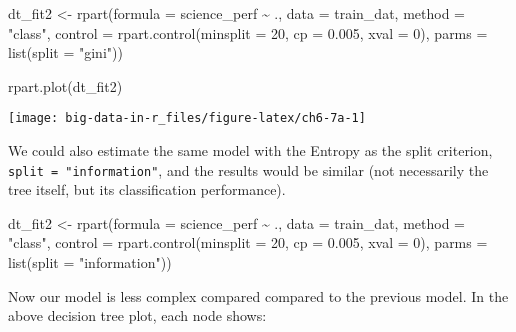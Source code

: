 \documentclass[
]{book}
\newenvironment{Shaded}{\begin{snugshade}}{\end{snugshade}}
\newcommand{\AttributeTok}[1]{\textcolor[rgb]{0.77,0.63,0.00}{#1}}
\newcommand{\DecValTok}[1]{\textcolor[rgb]{0.00,0.00,0.81}{#1}}
\newcommand{\FloatTok}[1]{\textcolor[rgb]{0.00,0.00,0.81}{#1}}
\newcommand{\FunctionTok}[1]{\textcolor[rgb]{0.00,0.00,0.00}{#1}}
\newcommand{\NormalTok}[1]{#1}
\newcommand{\OtherTok}[1]{\textcolor[rgb]{0.56,0.35,0.01}{#1}}
\newcommand{\SpecialCharTok}[1]{\textcolor[rgb]{0.00,0.00,0.00}{#1}}
\newcommand{\StringTok}[1]{\textcolor[rgb]{0.31,0.60,0.02}{#1}}
\begin{document}
\begin{Shaded}
\begin{Highlighting}[]
\NormalTok{dt\_fit2 }\OtherTok{\textless{}{-}} \FunctionTok{rpart}\NormalTok{(}\AttributeTok{formula =}\NormalTok{ science\_perf }\SpecialCharTok{\textasciitilde{}}\NormalTok{ .,}
                 \AttributeTok{data =}\NormalTok{ train\_dat,}
                 \AttributeTok{method =} \StringTok{"class"}\NormalTok{, }
                 \AttributeTok{control =} \FunctionTok{rpart.control}\NormalTok{(}\AttributeTok{minsplit =} \DecValTok{20}\NormalTok{, }
                                         \AttributeTok{cp =} \FloatTok{0.005}\NormalTok{, }
                                         \AttributeTok{xval =} \DecValTok{0}\NormalTok{),}
                \AttributeTok{parms =} \FunctionTok{list}\NormalTok{(}\AttributeTok{split =} \StringTok{"gini"}\NormalTok{))}

\FunctionTok{rpart.plot}\NormalTok{(dt\_fit2)}
\end{Highlighting}
\end{Shaded}

\texttt{[image: big-data-in-r\_files/figure-latex/ch6-7a-1]}

We could also estimate the same model with the Entropy as the split criterion, \texttt{split\ =\ "information"}, and the results would be similar (not necessarily the tree itself, but its classification performance).

\begin{Shaded}
\begin{Highlighting}[]
\NormalTok{dt\_fit2 }\OtherTok{\textless{}{-}} \FunctionTok{rpart}\NormalTok{(}\AttributeTok{formula =}\NormalTok{ science\_perf }\SpecialCharTok{\textasciitilde{}}\NormalTok{ .,}
                 \AttributeTok{data =}\NormalTok{ train\_dat,}
                 \AttributeTok{method =} \StringTok{"class"}\NormalTok{, }
                 \AttributeTok{control =} \FunctionTok{rpart.control}\NormalTok{(}\AttributeTok{minsplit =} \DecValTok{20}\NormalTok{, }
                                         \AttributeTok{cp =} \FloatTok{0.005}\NormalTok{, }
                                         \AttributeTok{xval =} \DecValTok{0}\NormalTok{),}
                \AttributeTok{parms =} \FunctionTok{list}\NormalTok{(}\AttributeTok{split =} \StringTok{"information"}\NormalTok{))}
\end{Highlighting}
\end{Shaded}

Now our model is less complex compared compared to the previous model. In the above decision tree plot, each node shows:
\end{document}
